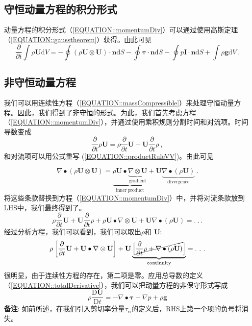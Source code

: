 \documentclass[LBMDerivation.tex]{subfiles}
\begin{document}
\subsection{守恒动量方程的积分形式}
%
%
   动量方程的积分形式（\ref{EQUATION::momentumDiv}）可以通过使用高斯定理（\ref{EQUATION::gausstheorem}）获得。由此可见
%
%
%
\begin{equation}
 \boxed{
    \frac{\partial}{\partial t} \int \rho \textbf{U} \mathrm{d}V
=
    -   \oint (\rho\textbf{U} \otimes \textbf{U}) \cdot \textbf{n} \mathrm{d}S
    -   \oint \boldsymbol \tau  \cdot \textbf{n} \mathrm{d}S
    -   \oint p\textbf{I} \cdot \textbf{n} \mathrm{d}S
    + \int \rho\textbf{g}  \mathrm{d}V
 } ~.
\end{equation}
%
%
%
\subsection{非守恒动量方程}
%
%
    我们可以用连续性方程（\ref{EQUATION::massCompressible}）来处理守恒动量方程。因此，我们得到了非守恒的形式。为此，我们首先考虑方程（\ref{EQUATION::momentumDiv}），并通过使用乘积规则分割时间和对流项。时间导数变成
%
%
\begin{equation}
  \frac{\partial}{\partial t} \rho \textbf{U}
=
  \rho \frac{\partial}{\partial t} \textbf{U} + \textbf{U} \frac{\partial}{\partial t} \rho ~,
\end{equation}
%
%
  和对流项可以用公式重写 (\ref{EQUATION::productRuleVV})。由此可见

%
%
\begin{equation}
  \nabla \bullet \left(\rho\textbf{U} \otimes \textbf{U}\right)
=
  \underbrace{\rho\textbf{U} \bullet \underbrace{\nabla \otimes \textbf{U}}_{\mathrm{gradient}}}_{\mathrm{inner~product}} + \textbf{U} \underbrace{\nabla \bullet (\rho\textbf{U})}_{\mathrm{divergence}} ~.
\end{equation}
%
%
    将这些条款替换到方程（\ref{EQUATION::momentumDiv}）中，并将对流条款放到LHS中，我们最终得到了。
%
%
\begin{equation}
   \rho \frac{\partial}{\partial t} \textbf{U} + \textbf{U} \frac{\partial}{\partial t} \rho
+
   \rho\textbf{U} \bullet \nabla \otimes \textbf{U} + \textbf{U} \nabla \bullet (\rho\textbf{U})
=
   .~.~.
\end{equation}
%
%
    经过分析方程，我们可以看到，我们可以取出$\rho$和    $\textbf{U}$:
%
%
\begin{equation}
   \rho \left[\frac{\partial}{\partial t} \textbf{U} + \textbf{U} \bullet \nabla \otimes \textbf{U}\right]
+
\textbf{U} \underbrace{\left[\cancel{\frac{\partial}{\partial t} \rho + \nabla \bullet (\rho\textbf{U})}\right]}_{\mathrm{continuity}}
=
   .~.~.
\end{equation}
%
%
    很明显，由于连续性方程的存在，第二项是零。应用总导数的定义（\ref{EQUATION::totalDerivative}），我们可以把动量方程的非保守形式写成
%
%
\begin{equation}
  \rho \frac{\mathrm{D}\textbf{U}}{\mathrm{D}t}
=
    -   \nabla \bullet \boldsymbol \tau
    -   \nabla p
    + \rho\textbf{g}
\label{EQUATION::momentumDivNon}
\end{equation}
%
%
    \textbf{备注}: 如前所述，在我们引入剪切率分量$\tau_{ii}$的定义后，RHS上第一个项的负号将消失。
%
%
%
%
%

\end{document}
